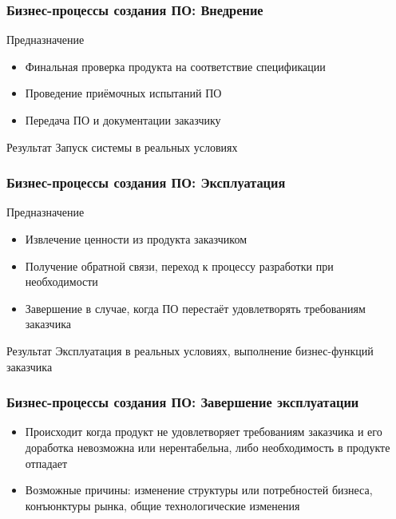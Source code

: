 \documentclass{../industrial-development}
\begin{document}
\begin{frame} \frametitle{Бизнес-процессы создания ПО: Внедрение}
	\begin{block}{Предназначение}
		\begin{itemize}
			\item Финальная проверка продукта на соответствие спецификации
			\item Проведение приёмочных испытаний ПО
			\item Передача ПО и документации заказчику
		\end{itemize}
	\end{block}
	\begin{block}{Результат}
		Запуск системы в реальных условиях
	\end{block}
\end{frame}
\lecturenotes


\begin{frame} \frametitle{Бизнес-процессы создания ПО: Эксплуатация}
	\begin{block}{Предназначение}
		\begin{itemize}
			\item Извлечение ценности из продукта заказчиком
			\item Получение обратной связи, переход к процессу разработки при необходимости
			\item Завершение в случае, когда ПО перестаёт удовлетворять требованиям заказчика
		\end{itemize}
	\end{block}
	\begin{block}{Результат}
		Эксплуатация в реальных условиях, выполнение бизнес-функций заказчика
	\end{block}
\end{frame}
\lecturenotes


\begin{frame} \frametitle{Бизнес-процессы создания ПО: Завершение эксплуатации}
	\begin{itemize}
		\item Происходит когда продукт не удовлетворяет требованиям заказчика и его доработка невозможна или нерентабельна, либо необходимость в продукте отпадает
		\item Возможные причины: изменение структуры или потребностей бизнеса, конъюнктуры рынка, общие технологические изменения
	\end{itemize}
\end{frame}
\lecturenotes
\end{document}
